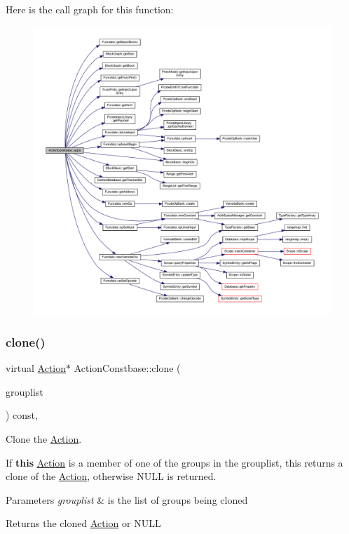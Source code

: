 Here is the call graph for this function\+:
\nopagebreak
\begin{figure}[H]
\begin{center}
\leavevmode
\includegraphics[width=350pt]{class_action_constbase_acdc2434caa56bded4425c19e0b68bdfc_cgraph}
\end{center}
\end{figure}
\mbox{\label{class_action_constbase_ab9c45ce9b49d6543abced9909598f2e0}} 
\subsubsection{\texorpdfstring{clone()}{clone()}}
{\footnotesize\ttfamily virtual \mbox{\hyperlink{class_action}{Action}}$\ast$ Action\+Constbase\+::clone (\begin{DoxyParamCaption}\item[{const \mbox{\hyperlink{class_action_group_list}{Action\+Group\+List}} \&}]{grouplist }\end{DoxyParamCaption}) const\hspace{0.3cm}{\ttfamily [inline]}, {\ttfamily [virtual]}}



Clone the \mbox{\hyperlink{class_action}{Action}}. 

If {\bfseries{this}} \mbox{\hyperlink{class_action}{Action}} is a member of one of the groups in the grouplist, this returns a clone of the \mbox{\hyperlink{class_action}{Action}}, otherwise N\+U\+LL is returned. 
\begin{DoxyParams}{Parameters}
{\em grouplist} & is the list of groups being cloned \\
\hline
\end{DoxyParams}
\begin{DoxyReturn}{Returns}
the cloned \mbox{\hyperlink{class_action}{Action}} or N\+U\+LL 
\end{DoxyReturn}


